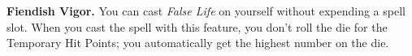 \textbf{Fiendish Vigor.} You can cast \textit{False Life} on yourself without expending a spell slot. When you cast the spell with this feature, you don't roll the die for the Temporary Hit Points; you automatically get the highest number on the die.

